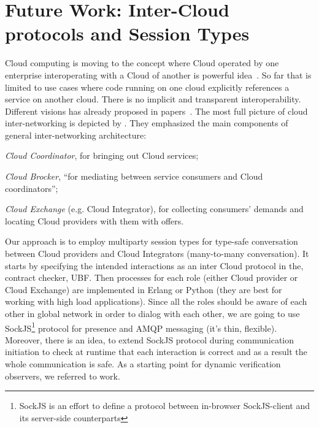 \documentclass[10pt]{llncs}
\begin{document}


\section{Future Work: Inter-Cloud protocols and Session Types}
\label{sect:highlights}
Cloud computing is moving to the concept where Cloud operated by one enterprise interoperating with a Cloud of another is powerful idea~\cite{Buyya2009,intercloud}.
So far that is limited to use cases where code running on one cloud explicitly references a service on another cloud. There is no implicit and transparent interoperability. 
Different visions has already proposed in papers~\cite{utility-driven-fed,xmpp-intercloud-transport,cloud-integrator}. The most full picture of cloud inter-networking is depicted by \cite{utility-driven-fed}. They emphasized the main components of general inter-networking architecture:
\begin{inparaenum}
\item \textit{Cloud Coordinator}, for bringing out Cloud services;
\item \textit{Cloud Brocker}, ``for mediating between service consumers and Cloud coordinators'';
\item \textit{Cloud Exchange} (e.g. Cloud Integrator), for collecting consumers' demands and locating Cloud providers with them with offers.
\end{inparaenum}

Our approach is to employ multiparty session types \cite{ng2012multiparty} for type-safe conversation between Cloud providers and Cloud Integrators (many-to-many conversation). It starts by specifying the intended interactions as an inter Cloud protocol in the, contract checker, UBF. Then processes for each role (either Cloud provider or Cloud Exchange) are implemented in Erlang or Python (they are best for working with high load applications). Since all the roles should be aware of each other in global network in order to dialog with each other, we are going to use SockJS\footnote{SockJS is an effort to define a protocol between in-browser SockJS-client and its server-side counterparts} protocol for presence and AMQP messaging (it's thin, flexible). Moreover, there is an idea, to extend SockJS protocol during communication initiation to check at runtime that each interaction is correct and as a result the whole communication is safe. As a starting point for dynamic verification observers, we referred to \cite{safe-conver-prog-python} work.
\end{document}
